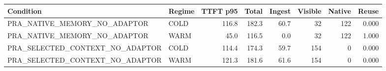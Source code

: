 \begin{tabular}{llrrrrrr}
\toprule
Condition & Regime & TTFT p95 & Total & Ingest & Visible & Native & Reuse \\
\midrule
PRA\_NATIVE\_MEMORY\_NO\_ADAPTOR & COLD & 116.8 & 182.3 & 60.7 & 32 & 122 & 0.000 \\
PRA\_NATIVE\_MEMORY\_NO\_ADAPTOR & WARM & 45.0 & 116.5 & 0.0 & 32 & 122 & 1.000 \\
PRA\_SELECTED\_CONTEXT\_NO\_ADAPTOR & COLD & 114.4 & 174.3 & 59.7 & 154 & 0 & 0.000 \\
PRA\_SELECTED\_CONTEXT\_NO\_ADAPTOR & WARM & 121.3 & 181.6 & 61.6 & 154 & 0 & 0.000 \\
\bottomrule
\end{tabular}
